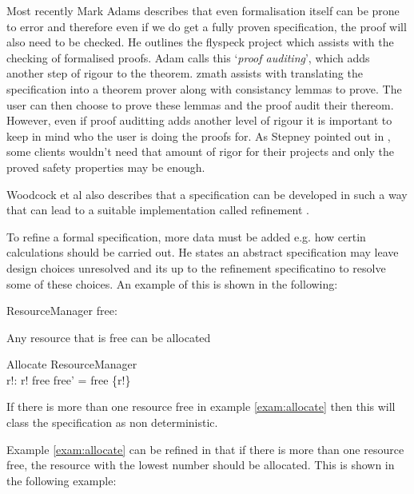 Most recently Mark Adams \cite{JFR4576} describes that even formalisation itself can be prone to error and therefore even if we do get a fully proven specification, the proof will also need to be checked. He outlines the flyspeck project which assists with the checking of formalised proofs. Adam calls this `\emph{proof auditing}', which adds another step of rigour to the theorem. \gls{zmath} assists with translating the specification into a theorem prover along with consistancy lemmas to prove. The user can then choose to prove these lemmas and the proof audit their thereom. However, even if proof auditting adds another level of rigour it is important to keep in mind who the user is doing the proofs for. As Stepney pointed out in \cite{stepney1998tale}, some clients wouldn't need that amount of rigor for their projects and only the proved safety properties may be enough.

Woodcock et al also describes that a specification can be developed in such a way that can lead to a suitable implementation called refinement \cite{Woodcock:1996:UZS:235337}. 

To refine a formal specification, more data must be added e.g. how certin calculations should be carried out. He states an abstract specification may leave design choices unresolved and its up to the refinement specificatino to resolve some of these choices. An example of this is shown in the following:

\begin{exam}

\begin{schema}{ResourceManager}
free:  \nat
\end{schema}

 Any resource that is free can be allocated

\begin{schema}{Allocate}
\Delta ResourceManager \\
r!: \nat
\where
r! \in free \land free' = free \setminus \{r!\}
\end{schema}

\label{exam:allocate} 
\end{exam}

If there is more than one resource free in example \ref{exam:allocate} then this will class the specification as non deterministic.

Example \ref{exam:allocate} can be refined in that if there is more than one resource free, the resource with the lowest number should be allocated. This is shown in the following example:

